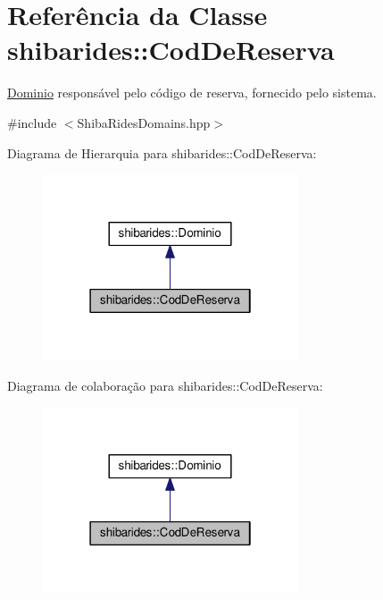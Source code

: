 \hypertarget{classshibarides_1_1CodDeReserva}{}\section{Referência da Classe shibarides\+:\+:Cod\+De\+Reserva}
\label{classshibarides_1_1CodDeReserva}


\hyperlink{classshibarides_1_1Dominio}{Dominio} responsável pelo código de reserva, fornecido pelo sistema.  




{\ttfamily \#include $<$Shiba\+Rides\+Domains.\+hpp$>$}



Diagrama de Hierarquia para shibarides\+:\+:Cod\+De\+Reserva\+:\nopagebreak
\begin{figure}[H]
\begin{center}
\leavevmode
\includegraphics[width=214pt]{classshibarides_1_1CodDeReserva__inherit__graph}
\end{center}
\end{figure}


Diagrama de colaboração para shibarides\+:\+:Cod\+De\+Reserva\+:\nopagebreak
\begin{figure}[H]
\begin{center}
\leavevmode
\includegraphics[width=214pt]{classshibarides_1_1CodDeReserva__coll__graph}
\end{center}
\end{figure}

